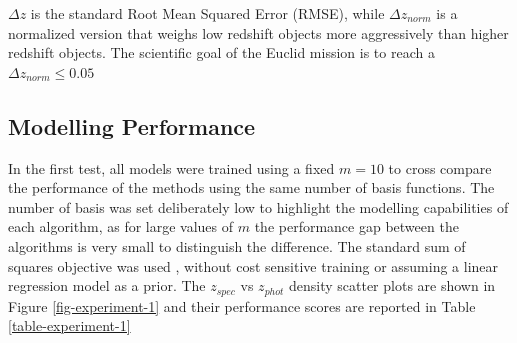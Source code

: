 \documentclass[useAMS,usenatbib,fleqn]{mn2e}
\begin{document}
$\Delta z$ is the standard Root Mean Squared Error (RMSE), while $\Delta z_{norm}$ is a normalized version that weighs low redshift objects more aggressively than higher redshift objects. The scientific goal of the Euclid mission is to reach a $\Delta z_{norm} \le 0.05$

\subsection{Modelling Performance}

In the first test, all models were trained using a fixed $m=10$ to cross compare the performance of the methods using the same number of basis functions. The number of basis was set deliberately low to highlight the modelling capabilities of each algorithm, as for large values of $m$ the performance gap between the algorithms is very small to distinguish the difference. The standard sum of squares objective was used , without cost sensitive training or assuming a linear regression model as a prior. The $z_{spec}$ vs $z_{phot}$ density scatter plots are shown in Figure \ref{fig-experiment-1} and their performance scores are reported in Table \ref{table-experiment-1}
\end{document}
